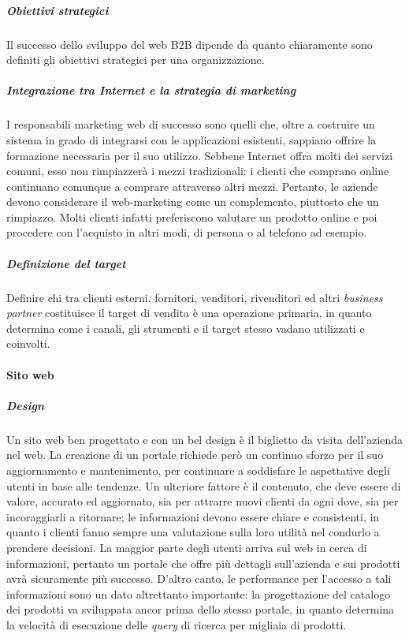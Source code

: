 \subparagraph{Obiettivi strategici}
Il successo dello sviluppo del web B2B dipende da quanto chiaramente sono definiti gli obiettivi strategici per una organizzazione.

\subparagraph{Integrazione tra Internet e la strategia di marketing}
I responsabili marketing web di successo sono quelli che, oltre a costruire un sistema in grado di integrarsi con le applicazioni esistenti, sappiano offrire la formazione necessaria per il suo utilizzo. Sebbene Internet offra molti dei servizi comuni, esso non rimpiazzerà i mezzi tradizionali: i clienti che comprano online continuano comunque a comprare attraverso altri mezzi. Pertanto, le aziende devono considerare il web-marketing come un complemento, piuttosto che un rimpiazzo. Molti clienti infatti preferiscono valutare un prodotto online e poi procedere con l'acquisto in altri modi, di persona o al telefono ad esempio.

\subparagraph{Definizione del target}
Definire chi tra clienti esterni, fornitori, venditori, rivenditori ed altri \textit{business partner} costituisce il target di vendita è una operazione primaria, in quanto determina come i canali, gli strumenti e il target stesso vadano utilizzati e coinvolti.

\paragraph{Sito web}
\subparagraph{Design}
Un sito web ben progettato e con un bel design è il biglietto da visita dell'azienda nel web. La creazione di un portale richiede però un continuo sforzo per il suo aggiornamento e mantenimento, per continuare a soddisfare le aspettative degli utenti in base alle tendenze. Un ulteriore fattore è il contenuto, che deve essere di valore, accurato ed aggiornato, sia per attrarre nuovi clienti da ogni dove, sia per incoraggiarli a ritornare; le informazioni devono essere chiare e consistenti, in quanto i clienti fanno sempre una valutazione sulla loro utilità nel condurlo a prendere decisioni. La maggior parte degli utenti arriva sul web in cerca di informazioni, pertanto un portale che offre più dettagli sull'azienda e sui prodotti avrà sicuramente più successo. D'altro canto, le performance per l'accesso a tali informazioni sono un dato altrettanto importante: la progettazione del catalogo dei prodotti va sviluppata ancor prima dello stesso portale, in quanto determina la velocità di esecuzione delle \textit{query} di ricerca per migliaia di prodotti.

